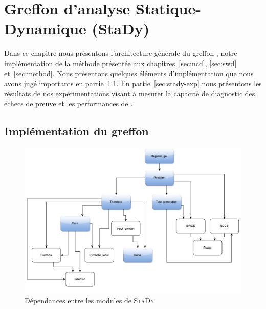 
\chapter{Greffon d'analyse Statique-Dynamique (StaDy)}
\label{sec:stady}

\chapterintro


Dans ce chapitre nous présentons l'architecture générale du greffon \stady,
notre implémentation de la méthode présentée aux chapitres~\ref{sec:ncd},
\ref{sec:swd} et~\ref{sec:method}.
Nous présentons quelques éléments d'implémentation que nous avons jugé
importants en partie~\ref{sec:stady-implem}.
En partie~\ref{sec:stady-exp} nous présentons les résultats de nos
expérimentations visant à mesurer la capacité de diagnostic des échecs de preuve
et les performances de \stady.


\section{Implémentation du greffon \stady}
\label{sec:stady-implem}


\begin{figure}[tb]
  \begin{center}
    \includegraphics[scale=.45]{figures/stady_architecture.pdf}
    \vspace{-.6cm}
    \caption{Dépendances entre les modules de \textsc{StaDy}
      \label{fig:stady-architecture}}
  \end{center}
\end{figure}


